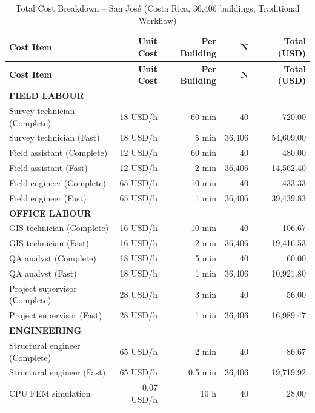 \begin{longtable}{lrrrr}
\caption{Total Cost Breakdown – San José (Costa Rica, 36,406 buildings, Traditional Workflow)} \\
\hline
\textbf{Cost Item} & \textbf{Unit Cost} & \textbf{Per Building} & \textbf{N} & \textbf{Total (USD)} \\
\hline
\endfirsthead

\hline
\textbf{Cost Item} & \textbf{Unit Cost} & \textbf{Per Building} & \textbf{N} & \textbf{Total (USD)} \\
\hline
\endhead

\multicolumn{5}{l}{\textbf{FIELD LABOUR}} \\

Survey technician (Complete) & 18 USD/h & 60 min & 40 & 720.00 \\
Survey technician (Fast) & 18 USD/h & 5 min & 36,406 & 54,609.00 \\
Field assistant (Complete) & 12 USD/h & 60 min & 40 & 480.00 \\
Field assistant (Fast) & 12 USD/h & 2 min & 36,406 & 14,562.40 \\
Field engineer (Complete) & 65 USD/h & 10 min & 40 & 433.33 \\
Field engineer (Fast) & 65 USD/h & 1 min & 36,406 & 39,439.83 \\
\hline

\multicolumn{5}{l}{\textbf{OFFICE LABOUR}} \\

GIS technician (Complete) & 16 USD/h & 10 min & 40 & 106.67 \\
GIS technician (Fast) & 16 USD/h & 2 min & 36,406 & 19,416.53 \\
QA analyst (Complete) & 18 USD/h & 5 min & 40 & 60.00 \\
QA analyst (Fast) & 18 USD/h & 1 min & 36,406 & 10,921.80 \\
Project supervisor (Complete) & 28 USD/h & 3 min & 40 & 56.00 \\
Project supervisor (Fast) & 28 USD/h & 1 min & 36,406 & 16,989.47 \\
\hline

\multicolumn{5}{l}{\textbf{ENGINEERING}} \\

Structural engineer (Complete) & 65 USD/h & 2 min & 40 & 86.67 \\
Structural engineer (Fast) & 65 USD/h & 0.5 min & 36,406 & 19,719.92 \\
CPU FEM simulation & 0.07 USD/h & 10 h & 40 & 28.00 \\


\end{longtable}
